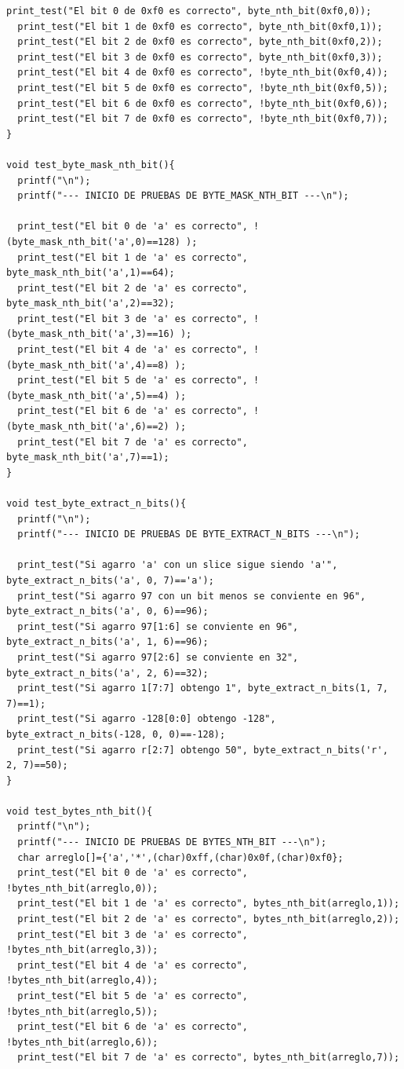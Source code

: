 \documentclass[11pt]{article}
\begin{document}
\begin{lstlisting}[style=Cstyle]
  print_test("El bit 0 de 0xf0 es correcto", byte_nth_bit(0xf0,0));
  print_test("El bit 1 de 0xf0 es correcto", byte_nth_bit(0xf0,1));
  print_test("El bit 2 de 0xf0 es correcto", byte_nth_bit(0xf0,2));
  print_test("El bit 3 de 0xf0 es correcto", byte_nth_bit(0xf0,3));
  print_test("El bit 4 de 0xf0 es correcto", !byte_nth_bit(0xf0,4));
  print_test("El bit 5 de 0xf0 es correcto", !byte_nth_bit(0xf0,5));
  print_test("El bit 6 de 0xf0 es correcto", !byte_nth_bit(0xf0,6));
  print_test("El bit 7 de 0xf0 es correcto", !byte_nth_bit(0xf0,7));
}

void test_byte_mask_nth_bit(){
  printf("\n");
  printf("--- INICIO DE PRUEBAS DE BYTE_MASK_NTH_BIT ---\n");

  print_test("El bit 0 de 'a' es correcto", !(byte_mask_nth_bit('a',0)==128) );
  print_test("El bit 1 de 'a' es correcto", byte_mask_nth_bit('a',1)==64);
  print_test("El bit 2 de 'a' es correcto", byte_mask_nth_bit('a',2)==32);
  print_test("El bit 3 de 'a' es correcto", !(byte_mask_nth_bit('a',3)==16) );
  print_test("El bit 4 de 'a' es correcto", !(byte_mask_nth_bit('a',4)==8) );
  print_test("El bit 5 de 'a' es correcto", !(byte_mask_nth_bit('a',5)==4) );
  print_test("El bit 6 de 'a' es correcto", !(byte_mask_nth_bit('a',6)==2) );
  print_test("El bit 7 de 'a' es correcto", byte_mask_nth_bit('a',7)==1);
}

void test_byte_extract_n_bits(){
  printf("\n");
  printf("--- INICIO DE PRUEBAS DE BYTE_EXTRACT_N_BITS ---\n");

  print_test("Si agarro 'a' con un slice sigue siendo 'a'", byte_extract_n_bits('a', 0, 7)=='a');
  print_test("Si agarro 97 con un bit menos se conviente en 96", byte_extract_n_bits('a', 0, 6)==96);
  print_test("Si agarro 97[1:6] se conviente en 96", byte_extract_n_bits('a', 1, 6)==96);
  print_test("Si agarro 97[2:6] se conviente en 32", byte_extract_n_bits('a', 2, 6)==32);
  print_test("Si agarro 1[7:7] obtengo 1", byte_extract_n_bits(1, 7, 7)==1);
  print_test("Si agarro -128[0:0] obtengo -128", byte_extract_n_bits(-128, 0, 0)==-128);
  print_test("Si agarro r[2:7] obtengo 50", byte_extract_n_bits('r', 2, 7)==50);
}

void test_bytes_nth_bit(){
  printf("\n");
  printf("--- INICIO DE PRUEBAS DE BYTES_NTH_BIT ---\n");
  char arreglo[]={'a','*',(char)0xff,(char)0x0f,(char)0xf0};
  print_test("El bit 0 de 'a' es correcto", !bytes_nth_bit(arreglo,0));
  print_test("El bit 1 de 'a' es correcto", bytes_nth_bit(arreglo,1));
  print_test("El bit 2 de 'a' es correcto", bytes_nth_bit(arreglo,2));
  print_test("El bit 3 de 'a' es correcto", !bytes_nth_bit(arreglo,3));
  print_test("El bit 4 de 'a' es correcto", !bytes_nth_bit(arreglo,4));
  print_test("El bit 5 de 'a' es correcto", !bytes_nth_bit(arreglo,5));
  print_test("El bit 6 de 'a' es correcto", !bytes_nth_bit(arreglo,6));
  print_test("El bit 7 de 'a' es correcto", bytes_nth_bit(arreglo,7));


\end{lstlisting}
\end{document}
